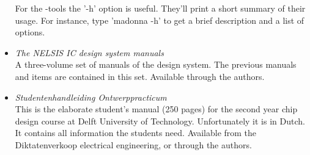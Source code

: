 \begin{itemize}
For the -tools the '-h' option is useful. They'll print a short
summary of their usage. For instance, type 'madonna -h' to get a brief
description and a list of options.
\item
{\em The NELSIS IC design system
manuals}\\ A three-volume set of manuals of the  design system. The
previous manuals and items are contained in this set.  Available through the
authors.
\item
{\em Studentenhandleiding Ontwerppracticum}\\
This is the elaborate student's
manual (250 pages) for the second year chip design course at Delft University of
Technology.  Unfortunately it is in Dutch. It contains all information the
students need. Available from the Diktatenverkoop electrical engineering, or
through the authors.
\end{itemize}
